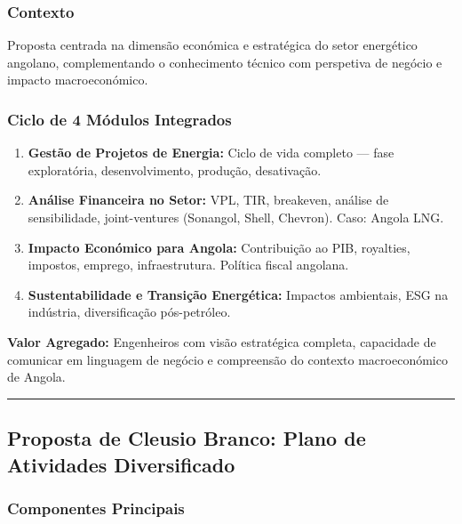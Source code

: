 \documentclass[12pt,a4paper]{article}
\newcommand{\proposalsep}{%
  \vspace{6pt}%
  {\color{gold}\rule{0.35\linewidth}{0.7pt}}%
  \vspace{4pt}%
}
\begin{document}
\subsubsection*{Contexto}
Proposta centrada na dimensão económica e estratégica do setor energético angolano, complementando o conhecimento técnico com perspetiva de negócio e impacto macroeconómico.

\subsubsection*{Ciclo de 4 Módulos Integrados}

\begin{enumerate}
    \item \textbf{Gestão de Projetos de Energia:} Ciclo de vida completo — fase exploratória, desenvolvimento, produção, desativação.
    \item \textbf{Análise Financeira no Setor:} VPL, TIR, breakeven, análise de sensibilidade, joint-ventures (Sonangol, Shell, Chevron). Caso: Angola LNG.
    \item \textbf{Impacto Económico para Angola:} Contribuição ao PIB, royalties, impostos, emprego, infraestrutura. Política fiscal angolana.
    \item \textbf{Sustentabilidade e Transição Energética:} Impactos ambientais, ESG na indústria, diversificação pós-petróleo.
\end{enumerate}

\begin{infobox}
\small\textbf{Valor Agregado:} Engenheiros com visão estratégica completa, capacidade de comunicar em linguagem de negócio e compreensão do contexto macroeconómico de Angola.
\end{infobox}

\proposalsep

\subsection{Proposta de Cleusio Branco: Plano de Atividades Diversificado}

\subsubsection*{Componentes Principais}
\end{document}

